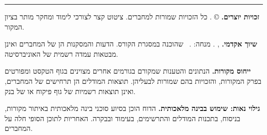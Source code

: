 \clearpage
\setcounter{page}{2}
\thispagestyle{empty}
\null\vfill
\begingroup
\setlength{\parindent}{0pt}\setlength{\parskip}{0.7em}
{\large\bfseries\color{brandNavy} \ReportTitle\par}
\ReportSubtitle\par
\begin{english}
\textbf{\ReportTitleEn}\par
\ReportSubtitleEn\par
\end{english}

{\color{brandSteel}\rule{\textwidth}{0.6pt}\par}

\textbf{זכויות יוצרים.} ©  \Authors. כל הזכויות שמורות למחברים. ציטוט קצר לצורכי לימוד ומחקר מותר בציון המקור.

\textbf{שיוך אקדמי.} \Institution, \CourseLine. מנחה: \Supervisor. \ReportType\ שהוכנה במסגרת הקורס. הדעות והמסקנות הן של המחברים ואינן מבטאות עמדה רשמית של האוניברסיטה.

\textbf{ייחוס מקורות.} הנתונים והטענות שמקורם בגורמים אחרים מצוינים בגוף הטקסט ומפורטים בפרק המקורות, והזכויות בהם שמורות לבעליהן. תוצאות המודלים הן תרחישים של המחברים, ואינן תוצאות רשמיות של גוף פיקוח או של בנק.

\sloppy \textbf{גילוי נאות: שימוש בבינה מלאכותית.} הדוח הוכן בסיוע סוכני בינה מלאכותית  באיתור מקורות, בניסוח, בתכנות המודלים והתרשימים, בעימוד ובבקרה. האחריות לתוכן הסופי חלה על המחברים.\par\fussy
\endgroup
\vspace*{1cm}
\clearpage
